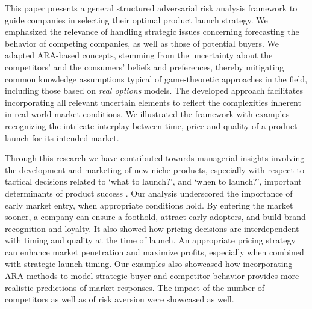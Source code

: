 \documentclass[a4paper,fleqn, 11pt]{cas-sc}
\begin{document}
  This paper presents a general structured adversarial risk analysis framework to guide companies in selecting their optimal product launch strategy.
     We emphasized the relevance of handling strategic issues concerning 
     forecasting the behavior of competing companies, as well as those of potential buyers. We adapted ARA-based concepts, stemming from the uncertainty 
     about the competitors' and the consumers' beliefs and preferences, thereby  mitigating common knowledge assumptions
     typical of game-theoretic approaches in the field, including those based on \emph{real options} models.      
      The developed approach facilitates incorporating all relevant uncertain elements to reflect the complexities inherent in real-world market conditions.
       We illustrated the framework with examples recognizing the intricate interplay
   between time, price and quality of a product launch for its intended market. 

Through this research we have contributed towards managerial insights involving the  development and marketing of new niche products, especially with respect to tactical decisions related to `what to launch?', and `when to launch?', important determinants of product success \citep{hultink1997industrial, di1999identifying, calantone2007clustering}. 
Our analysis underscored the importance of early market entry,  when appropriate conditions hold. By entering the market sooner, a company can ensure a foothold, attract early adopters, and build brand recognition and loyalty. It also showed how pricing decisions are interdependent with timing and quality at the time of launch. An appropriate   pricing strategy can enhance market penetration and maximize profits, especially when combined with strategic launch timing. Our examples also showcased how incorporating ARA methods to model strategic buyer and competitor behavior provides more realistic predictions of market responses.  The impact of the number of competitors as well as of risk aversion were 
showcased as well. 
\end{document}
